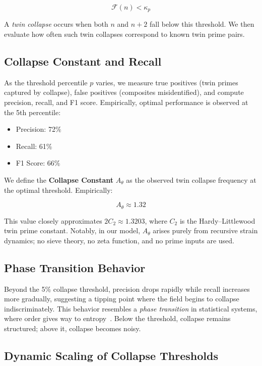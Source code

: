 \documentclass[11pt]{article}
\begin{document}
\[
\mathcal{F}(n) < \kappa_p
\]

A \textit{twin collapse} occurs when both \(n\) and \(n+2\) fall below this threshold. We then evaluate how often such twin collapses correspond to known twin prime pairs.

\subsection{Collapse Constant and Recall}

As the threshold percentile \(p\) varies, we measure true positives (twin primes captured by collapse), false positives (composites misidentified), and compute precision, recall, and F1 score. Empirically, optimal performance is observed at the 5th percentile:

\begin{itemize}
  \item Precision: 72\%
  \item Recall: 61\%
  \item F1 Score: 66\%
\end{itemize}

We define the \textbf{Collapse Constant} $A_\theta$ as the observed twin collapse frequency at the optimal threshold. Empirically:

\[
A_\theta \approx 1.32
\]

This value closely approximates \(2C_2 \approx 1.3203\), where \(C_2\) is the Hardy–Littlewood twin prime constant. Notably, in our model, \(A_\theta\) arises purely from recursive strain dynamics; no sieve theory, no zeta function, and no prime inputs are used.

\subsection{Phase Transition Behavior}

Beyond the 5\% collapse threshold, precision drops rapidly while recall increases more gradually, suggesting a tipping point where the field begins to collapse indiscriminately. This behavior resembles a \textit{phase transition} in statistical systems, where order gives way to entropy~\cite{bak}. Below the threshold, collapse remains structured; above it, collapse becomes noisy.

\subsection{Dynamic Scaling of Collapse Thresholds}
\end{document}
